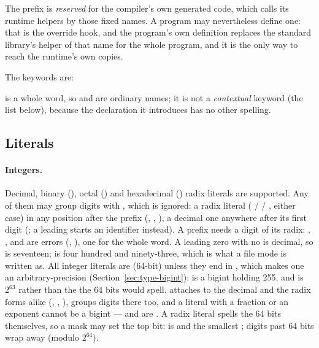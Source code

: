 The prefix  is \emph{reserved} for the compiler's own generated
code, which calls its runtime helpers by those fixed names. A program may
nevertheless define one: that is the override hook, and the program's own
definition replaces the standard library's helper of that name for the
whole program, and it is the only way to reach the runtime's own copies.

The keywords are:
\begin{center}
       
     
\end{center}

 is a whole word, so  and  are
ordinary names; it is not a \emph{contextual} keyword (the list below),
because the declaration it introduces has no other spelling.

\subsection{Literals}
\label{sec:literals}

\paragraph{Integers.} Decimal, binary (), octal ()
and hexadecimal () radix literals are supported. Any of them may
group digits
with \ic{\_}, which is ignored: a radix literal ( /  /
, either case) in any position after the prefix (,
, ), a decimal one anywhere after its
first digit
(; a leading \ic{\_} starts an identifier instead).
A prefix needs a digit of its radix: , ,  and
are errors (, ), one for the whole
word.
A leading zero with no  is decimal, so  is seventeen;
 is four hundred and ninety-three, which is what a file mode is
written as. All integer
literals are  (64-bit) unless they end in , which makes one
an arbitrary-precision  (Section~\ref{sec:type-bigint}): 
is a bigint holding 255, and  is $2^{63}$ rather
than the  the 64 bits would spell.  attaches
to the decimal and the radix forms alike (, ,
), \ic{\_} groups digits there too, and a literal with a fraction
or an exponent cannot be a bigint ---  and  are
. A
radix literal spells the 64 bits
themselves, so a mask may set the top bit:
 is  and
 the smallest ; digits past 64
bits wrap away (modulo $2^{64}$).

